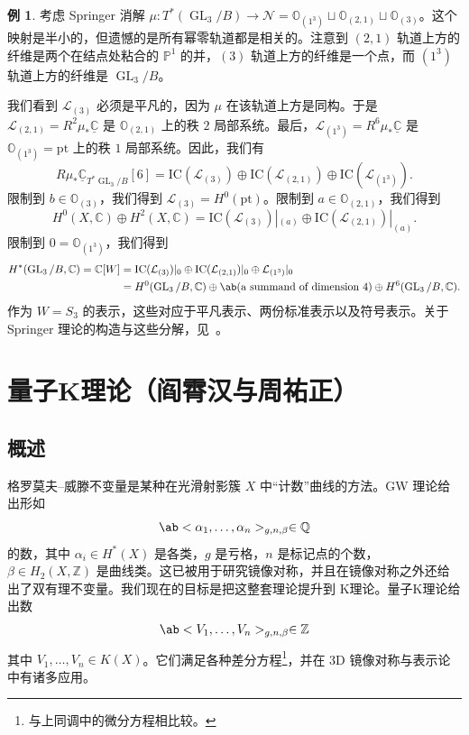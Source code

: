 \documentclass{amsart}
\theoremstyle{definition}
\newtheorem{exm}[thm]{例}
\theoremstyle{remark}
\theoremstyle{plain}
\theoremstyle{definition}
\theoremstyle{remark}
\newcommand{\C}{\mathbb{C}}
\newcommand{\Z}{\mathbb{Z}}
\newcommand{\Q}{\mathbb{Q}}
\renewcommand{\P}{\mathbb{P}}
\newcommand{\mc}[1]{\mathcal{#1}}
\newcommand{\mr}[1]{\mathrm{#1}}
\newcommand{\on}[1]{\operatorname{#1}}
\newcommand{\ul}[1]{\underline{#1}}
\newcommand{\1}{\mathbf{1}}
\newcommand{\2}{\mathbf{2}}
\newcommand{\3}{\mathbf{3}}
\begin{document}
\begin{exm}
    考虑 Springer 消解 \(\mu \colon T^*(\on{GL}_3/B) \to \mc{N} = \mathbb{O}_{(1^3)} \sqcup \mathbb{O}_{(2,1)} \sqcup \mathbb{O}_{(3)}\)。这个映射是半小的，但遗憾的是所有幂零轨道都是相关的。注意到 \((2,1)\) 轨道上方的纤维是两个在结点处粘合的 \(\P^1\) 的并，\((3)\) 轨道上方的纤维是一个点，而 \((1^3)\) 轨道上方的纤维是 \(\on{GL}_3/B\)。

    我们看到 \(\mc{L}_{(3)}\) 必须是平凡的，因为 \(\mu\) 在该轨道上方是同构。于是 \(\mc{L}_{(2,1)} = R^2 \mu_* \ul{\C}\) 是 \(\mathbb{O}_{(2,1)}\) 上的秩 \(2\) 局部系统。最后，\(\mc{L}_{(1^3)} = R^6 \mu_* \ul{\C}\) 是 \(\mathbb{O}_{(1^3)} = \mr{pt}\) 上的秩 \(1\) 局部系统。因此，我们有
    \[ R \mu_* \ul{\C}_{T^*\on{GL}_3/B}[6] = \mr{IC}(\mc{L}_{(3)}) \oplus \mr{IC}(\mc{L}_{(2,1)}) \oplus \mr{IC}(\mc{L}_{(1^3)}). \]
    限制到 \(b \in \mathbb{O}_{(3)}\)，我们得到 \(\mc{L}_{(3)} = H^0(\mr{pt})\)。限制到 \(a \in \mathbb{O}_{(2,1)}\)，我们得到
    \[ H^0(X, \C) \oplus H^2(X, \C) = \mr{IC}(\mc{L}_{(3)})|_{(a)} \oplus \mr{IC}(\mc{L}_{(2,1)})|_{(a)}. \]
    限制到 \(0 = \mathbb{O}_{(1^3)}\)，我们得到
    \begin{align*}
        H^*(\on{GL}_3/B, \C) = \C[W] &= \mr{IC}(\mc{L}_{(3)})|_0 \oplus \mr{IC}(\mc{L}_{(2,1)})|_0 \oplus \mc{L}_{(1^3)}|_0 \\
        &= H^0(\on{GL}_3/B, \C) \oplus \ab(\text{a summand of dimension } 4) \oplus H^6(\on{GL}_3/B, \C).
    \end{align*}
    作为 \(W = S_3\) 的表示，这些对应于平凡表示、两份标准表示以及符号表示。关于 Springer 理论的构造与这些分解，见~\cite{BorhoMacPherson1983}。
\end{exm}
\section{量子K理论（阎霄汉与周祐正）}%
\label{sec:Quantum K-theory (Xiaohan Yan and You-Cheng Chou)}

\subsection{概述}%
\label{sub:Overview}

格罗莫夫--威滕不变量是某种在光滑射影簇 \(X\) 中“计数”曲线的方法。GW 理论给出形如
\[ \ab<\alpha_1, \ldots, \alpha_n>_{g, n, \beta} \in \Q \]
的数，其中 \(\alpha_i \in H^*(X)\) 是各类，\(g\) 是亏格，\(n\) 是标记点的个数，\(\beta \in H_2(X, \Z)\) 是曲线类。这已被用于研究镜像对称，并且在镜像对称之外还给出了双有理不变量。我们现在的目标是把这整套理论提升到 K理论。量子K理论给出数
\[ \ab<V_1, \ldots, V_n>_{g, n, \beta} \in \Z \]
其中 \(V_1, \ldots, V_n \in K(X)\)。它们满足各种差分方程\footnote{与上同调中的微分方程相比较。}，并在 3D 镜像对称与表示论中有诸多应用。
\end{document}
